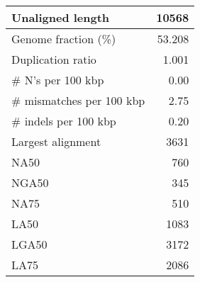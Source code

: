 \documentclass[12pt,a4paper]{article}
\begin{document}
\begin{table}[ht]
\begin{center}
\begin{tabular}{|l*{1}{|r}|}
Unaligned length & 10568 \\ \hline
Genome fraction (\%) & 53.208 \\ \hline
Duplication ratio & 1.001 \\ \hline
\# N's per 100 kbp & 0.00 \\ \hline
\# mismatches per 100 kbp & 2.75 \\ \hline
\# indels per 100 kbp & 0.20 \\ \hline
Largest alignment & 3631 \\ \hline
NA50 & 760 \\ \hline
NGA50 & 345 \\ \hline
NA75 & 510 \\ \hline
LA50 & 1083 \\ \hline
LGA50 & 3172 \\ \hline
LA75 & 2086 \\ \hline
\end{tabular}
\end{center}
\end{table}
\end{document}
